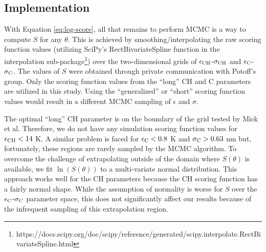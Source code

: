 \documentclass[preprint,review,11pt]{elsarticle}
\begin{document}
    \subsection{Implementation}

    With Equation \ref{eq:log-score}, all that remains to perform MCMC is a way to compute $S$ for any $\theta$. This is achieved by smoothing/interpolating the raw scoring function values (utilizing SciPy's RectBivariateSpline function in the interpolation sub-package\footnote{https://docs.scipy.org/doc/scipy/reference/generated/scipy.interpolate.RectBivariateSpline.html}) over the two-dimensional grids of $\epsilon_{\rm CH}$-$\sigma_{\rm CH}$ and $\epsilon_{\rm C}$-$\sigma_{\rm C}$. The values of $S$ were obtained through private communication with Potoff's group. Only the scoring function values from the ``long'' CH and C parameters are utilized in this study. Using the ``generalized'' or ``short'' scoring function values would result in a different MCMC sampling of $\epsilon$ and $\sigma$.
	
	The optimal ``long'' CH parameter is on the boundary of the grid tested by Mick et al. Therefore, we do not have any simulation scoring function values for $\epsilon_{\rm CH} < 14$ K. A similar problem is faced for $\epsilon_{\rm C} < 0.8$ K and $\sigma_{\rm C} > 0.63$ nm but, fortunately, these regions are rarely sampled by the MCMC algorithm. To overcome the challenge of extrapolating outside of the domain where $S(\theta)$ is available, we fit $\ln(S(\theta))$ to a multi-variate normal distribution. This approach works well for the CH parameters because the CH scoring function has a fairly normal shape. While the assumption of normality is worse for $S$ over the $\epsilon_{\rm C}$-$\sigma_{\rm C}$ parameter space, this does not significantly affect our results because of the infrequent sampling of this extrapolation region.   
\end{document}
